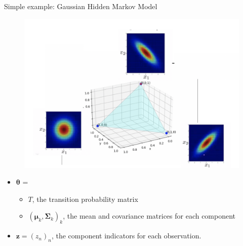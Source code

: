 \documentclass[10pt]{beamer}
\newcommand{\+}[1]{\ensuremath{{\boldsymbol #1}}} %
\begin{document}
\begin{frame}{Simple example: Gaussian Hidden Markov Model}

	\begin{figure} 
	\includegraphics[width=.7\textwidth]{images/bivariate_gaussian_hmm_2} 
	\end{figure}  
	
		\begin{itemize}
		\small
		\item $\+\theta$ = 
		\begin{itemize}		
		\item $T$, the transition probability matrix
		\item $(\+\mu_k, \+\Sigma_k)_k$, the mean and covariance matrices for each component
		\end{itemize}
		\item $\+z = (z_n)_n$, the component indicators for each observation. 
	\end{itemize} 
	
\end{frame}
\end{document}
